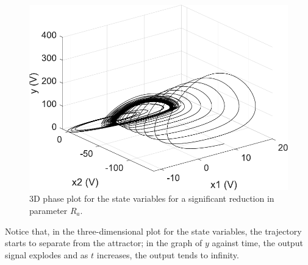     \begin{figure}[H]
        \centering
        \includegraphics[scale=0.5]{figs/3dParaAdown.pdf}
        \caption{3D phase plot for the state variables for a significant reduction in parameter $R_a$.}
        \label{fig:3dParaAdown}
    \end{figure}
    
     Notice that, in the three-dimensional plot for the state variables, the trajectory starts to separate from the attractor; in the graph of $y$ against time, the output signal explodes and as $t$ increases, the output tends to infinity.
    
